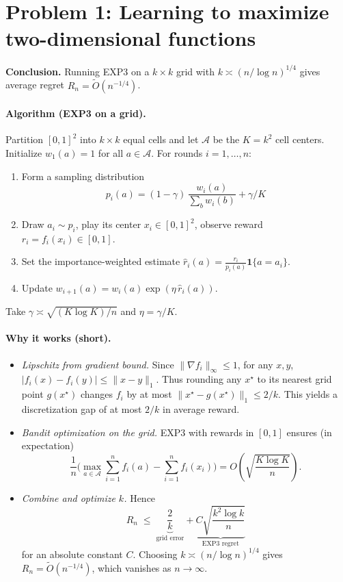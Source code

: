 \documentclass[11pt]{article}
\renewenvironment{shaded}{%
  \def\FrameCommand{\fboxsep=\FrameSep \colorbox{shadecolor}}%
  \MakeFramed{\advance\hsize-\width \FrameRestore\FrameRestore}}%
 {\endMakeFramed}
\begin{document}
\begin{shaded}
\section*{Problem 1: Learning to maximize two-dimensional functions}
\textbf{Conclusion.} Running EXP3 on a $k\times k$ grid with $k \asymp (n/\log n)^{1/4}$ gives average regret $R_n=\tilde{O}(n^{-1/4})$.

\paragraph{Algorithm (EXP3 on a grid).}
Partition $[0,1]^2$ into $k\times k$ equal cells and let $\mathcal{A}$ be the $K=k^2$ cell centers.
Initialize $w_1(a)=1$ for all $a\in\mathcal{A}$. For rounds $i=1,\dots,n$:
\begin{enumerate}
\item Form a sampling distribution 
\[
p_i(a)=(1-\gamma)\,\frac{w_i(a)}{\sum_{b}w_i(b)}+\gamma/K
\]
\item Draw $a_i\sim p_i$, play its center $x_i\in[0,1]^2$, observe reward $r_i=f_i(x_i)\in[0,1]$.
\item Set the importance-weighted estimate $\hat r_i(a)=\frac{r_i}{p_i(a)}\mathbf{1}\{a=a_i\}$.
\item Update $w_{i+1}(a)=w_i(a)\exp(\eta\,\hat r_i(a))$.
\end{enumerate}
Take $\gamma \asymp \sqrt{(K\log K)/n}$ and $\eta=\gamma/K$.

\paragraph{Why it works (short).}
\begin{itemize}
\item \emph{Lipschitz from gradient bound.} Since $\|\nabla f_i\|_\infty\le 1$, for any $x,y$,
$|f_i(x)-f_i(y)|\le \|x-y\|_1$. Thus rounding any $x^\star$ to its nearest grid point $g(x^\star)$ changes $f_i$ by at most $\|x^\star-g(x^\star)\|_1\le 2/k$.
This yields a discretization gap of at most $2/k$ in average reward.
\item \emph{Bandit optimization on the grid.} EXP3 with rewards in $[0,1]$ ensures (in expectation)
\[
\frac{1}{n}\Big(\max_{a\in\mathcal{A}}\sum_{i=1}^n f_i(a)-\sum_{i=1}^n f_i(x_i)\Big)
= O\!\left(\sqrt{\frac{K\log K}{n}}\right).
\]
\item \emph{Combine and optimize $k$.} Hence
\[
R_n \;\le\; \underbrace{\frac{2}{k}}_{\text{grid error}}
+\underbrace{C\sqrt{\frac{k^2\log k}{n}}}_{\text{EXP3 regret}}
\]
for an absolute constant $C$. Choosing $k\asymp (n/\log n)^{1/4}$ gives
$R_n=\tilde{O}(n^{-1/4})$, which vanishes as $n\to\infty$.
\end{itemize}


\end{shaded}
\end{document}
